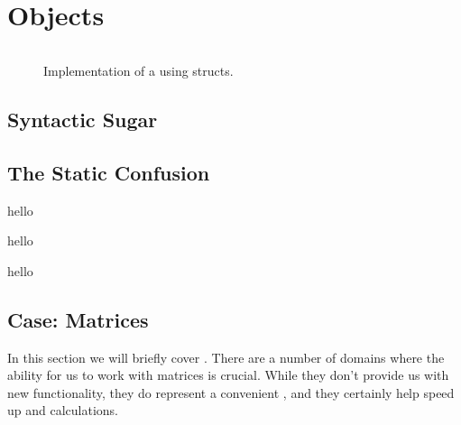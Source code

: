 \chapter{Objects}


\begin{figure}[tbp]
  \inputminted[fontsize=\footnotesize]{csharp}{../src/csharp/rectangle/Rectangle.cs}
  \caption{Implementation of a  using structs.}
  \label{fig:objects:rectangle:lib}
\end{figure}


\section{Syntactic Sugar}



\section{The Static Confusion}



\csharpsection{\csharp}
hello

hello

hello

\section{Case: Matrices}

In this section we will briefly cover . There are a number of domains where the ability for us to work with matrices is crucial. While they don't provide us with new functionality, they do represent a convenient , and they certainly help speed up  and  calculations.

